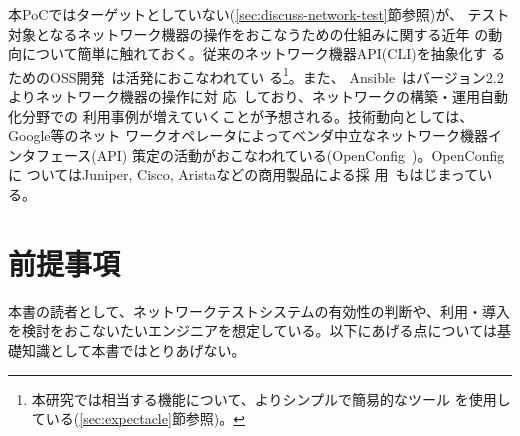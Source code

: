 本PoCではターゲットとしていない(\ref{sec:discuss-network-test}節参照)が、
テスト対象となるネットワーク機器の操作をおこなうための仕組みに関する近年
の動向について簡単に触れておく。従来のネットワーク機器API(CLI)を抽象化す
るためのOSS開発~\cite{netmiko-github,napalm-github}は活発におこなわれてい
る\footnote{本研究では相当する機能について、よりシンプルで簡易的なツール
を使用している(\ref{sec:expectacle}節参照)。}。また、
Ansible~\cite{ansible-web}はバージョン2.2よりネットワーク機器の操作に対
応~\cite{ansible-22-news}しており、ネットワークの構築・運用自動化分野での
利用事例が増えていくことが予想される。技術動向としては、Google等のネット
ワークオペレータによってベンダ中立なネットワーク機器インタフェース(API)
策定の活動がおこなわれている(OpenConfig~\cite{openconfig})。OpenConfigに
ついてはJuniper, Cisco, Aristaなどの商用製品による採
用~\cite{openconfig-news}もはじまっている。

 \section{前提事項}
 \label{sec:premise}

本書の読者として、ネットワークテストシステムの有効性の判断や、利用・導入
を検討をおこないたいエンジニアを想定している。以下にあげる点については基
礎知識として本書ではとりあげない。

